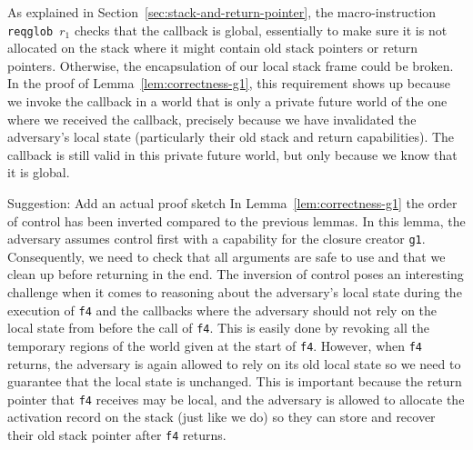 \documentclass[format=acmsmall, review=false, screen=true]{acmart}
\renewcommand{\sectionname}{Section}
\newcommand{\itoplassug}[1]
    {{\color{Blue} #1}}
\begin{document}
As explained in \sectionname~\ref{sec:stack-and-return-pointer}, the
macro-instruction \texttt{\footnotesize{reqglob $r_1$}} checks that the callback
is global, essentially to make sure it is not allocated on the stack where it
might contain old stack pointers or return pointers. Otherwise, the
encapsulation of our local stack frame could be broken. In the proof of
Lemma~\ref{lem:correctness-g1}, this requirement shows up because we invoke the
callback in a world that is only a private future world of the one where we
received the callback, precisely because we have invalidated the adversary's
local state (particularly their old stack and return capabilities). The callback
is still valid in this private future world, but only because we know that it is
global.

\itoplassug{Suggestion: Add an actual proof sketch}
In Lemma~\ref{lem:correctness-g1} the order of control has been
inverted compared to the previous lemmas. In this lemma, the adversary
assumes control first with a capability for the closure creator
\texttt{\footnotesize{g1}}. Consequently, we need to check that all
arguments are safe to use and that we clean up before returning in the
end. The inversion of control poses an interesting challenge when it
comes to reasoning about the adversary's local state during the
execution of \texttt{\footnotesize{f4}} and the callbacks where the
adversary should not rely on the local state from before the call of
\texttt{\footnotesize{f4}}. This is easily done by revoking all the
temporary regions of the world given at the start of
\texttt{\footnotesize{f4}}. However, when \texttt{\footnotesize{f4}}
returns, the adversary is again allowed to rely on its old local state
so we need to guarantee that the local state is unchanged. This is
important because the return pointer that \texttt{\footnotesize{f4}}
receives may be local, and the adversary is allowed
to allocate the activation record on the stack (just like we do) so
they can store and recover their old stack pointer after
\texttt{\footnotesize{f4}} returns.
\end{document}
